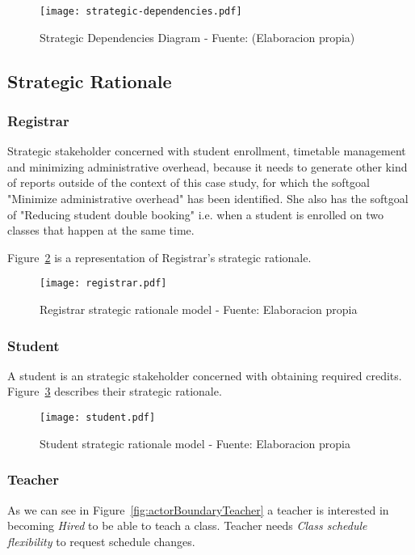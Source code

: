 \begin{figure}
	\caption{Strategic Dependencies Diagram - Fuente: (Elaboracion propia)}\label{fig:strategicDependenciesDiagram}
	\centering
	\texttt{[image: strategic-dependencies.pdf]}
\end{figure}

\subsection{Strategic Rationale}
\subsubsection{Registrar}
Strategic stakeholder concerned with student enrollment, timetable management and minimizing administrative overhead, because it needs to generate other kind of reports outside of the context of this case study, for which the softgoal "Minimize administrative overhead" has been identified.
She also has the softgoal of "Reducing student double booking" i.e. when a student is enrolled on two classes that happen at the same time.

Figure~\ref{fig:actorBoundaryRegistrar} is a representation of Registrar's strategic rationale.

\begin{landscape}
	\begin{figure}
		\centering
		\caption{Registrar strategic rationale model - Fuente: Elaboracion propia}
		\texttt{[image: registrar.pdf]}
		\label{fig:actorBoundaryRegistrar}
	\end{figure}
\end{landscape}

\subsubsection{Student}
A student is an strategic stakeholder concerned with obtaining required credits.
Figure~\ref{fig:actorBoundaryStudent} describes their strategic rationale.
\begin{figure}
	\centering
	\caption{Student strategic rationale model - Fuente: Elaboracion propia}
	\texttt{[image: student.pdf]}
	\label{fig:actorBoundaryStudent}
\end{figure}

\subsubsection{Teacher}
As we can see in Figure~\ref{fig:actorBoundaryTeacher} a teacher is interested in becoming \textit{Hired} to be able to teach a class.
Teacher needs \textit{Class schedule flexibility} to request schedule changes.

